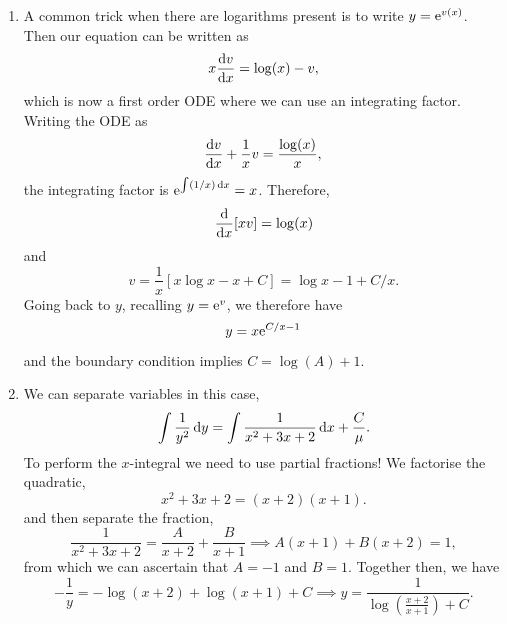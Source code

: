 \documentclass[a4paper, 12pt]{article}
\begin{document}
\begin{enumerate}[label={\bf \arabic{*}.\;}, ref={\arabic{*}},itemsep=3ex, left=0ex]
{\begin{enumerate}[label=(\alph{*})]
        \item A common trick when there are logarithms present is to write $y = \mathrm{e}^{v(x)}$. Then our equation can be written as
          \begin{equation}
            x\fd{v}{x}= \log(x) - v,
          \end{equation}
          which is now a first order ODE where we can use an integrating factor. Writing the ODE as
          \begin{equation}
            \label{oureq}
            \fd{v}{x}+\frac{1}{x}v = \frac{\log(x)}{x},
          \end{equation}
          the integrating factor is $\mathrm{e}^{\int(1/x)\,\mathrm{d}x}= x$. Therefore,
          \begin{equation}
            \fd{}{x}[xv] = \log(x)
          \end{equation}
          and
          \begin{equation}
            v = \frac{1}{x}[x \log x - x + C] = \log x - 1 + C/x.
          \end{equation}
          Going back to $y$, recalling $y=\mathrm{e}^{v}$, we therefore have
          \begin{equation}
            y = x\mathrm{e}^{C/x-1}
          \end{equation}
          and the boundary condition implies $C = \log(A)+1$.

        \item We can separate variables in this case,
          \begin{equation}
            \int\frac{1}{y^{2}}\,{\mathrm d} y =\int\frac{1}{x^{2}+3x +2}\,{\mathrm d} x + \frac{C}{\mu}.
          \end{equation}
          To perform the $x$-integral we need to use partial fractions! We factorise the quadratic,
          \begin{equation}
            x^{2} +3x +2 = (x+2)(x+1).
          \end{equation}
          and then separate the fraction,
          \begin{equation}
            \frac{1}{x^{2}+3x +2}= \frac{A}{x+2}+ \frac{B}{x+1}\implies A(x+1) + B(x+2) = 1,
          \end{equation}
          from which we can ascertain that $A=-1$ and $B=1$. Together then, we have
          \begin{equation}
            -\frac{1}{y}= -\log(x+2) + \log(x+1) +C
            \implies y = \frac{1}{\log\left(\frac{x+2}{x+1}\right) + C}.
          \end{equation}
      \end{enumerate}
    }


\end{enumerate}
\end{document}
